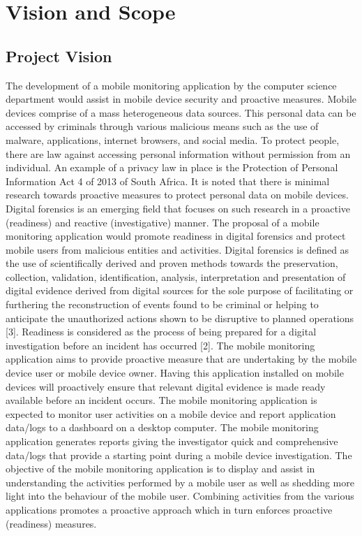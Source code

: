 \documentclass[hidelinks, 12pt, oneside]{article}
\begin{document}
	
	\tableofcontents
	\newpage
	\section{Vision and Scope}
	\subsection{Project Vision}
	The development of a mobile monitoring application by the computer science department would assist in mobile device security and proactive measures. Mobile devices comprise of a mass heterogeneous data sources. This personal data can be accessed by criminals through various malicious means such as the use of malware, applications, internet browsers, and social media. To protect people, there are law against accessing personal information without permission from an individual. An example of a privacy law in place is the Protection of Personal Information Act 4 of 2013 of South Africa. It is noted that there is minimal research towards proactive measures to protect personal data on mobile devices. Digital forensics is an emerging field that focuses on such research in a proactive (readiness) and reactive (investigative) manner. 
The proposal of a mobile monitoring application would promote readiness in digital forensics and protect mobile users from malicious entities and activities. Digital forensics is defined as the use of scientifically derived and proven methods towards the preservation, collection, validation, identification, analysis, interpretation and presentation of digital evidence derived from digital sources for the sole purpose of facilitating or furthering the reconstruction of events found to be criminal or helping to anticipate the unauthorized actions shown to be disruptive to planned operations [3].
Readiness is considered as the process of being prepared for a digital investigation before an incident has occurred [2]. The mobile monitoring application aims to provide proactive measure that are undertaking by the mobile device user or mobile device owner. Having this application installed on mobile devices will proactively ensure that relevant digital evidence is made ready available before an incident occurs. The mobile monitoring application is expected to monitor user activities on a mobile device and report application data/logs to a dashboard on a desktop computer. The mobile monitoring application generates reports giving the investigator quick and comprehensive data/logs that provide a starting point during a mobile device investigation. 
The objective of the mobile monitoring application is to display and assist in understanding the activities performed by a mobile user as well as shedding more light into the behaviour of the mobile user. Combining activities from the various applications promotes a proactive approach which in turn enforces proactive (readiness) measures. 
\end{document}
